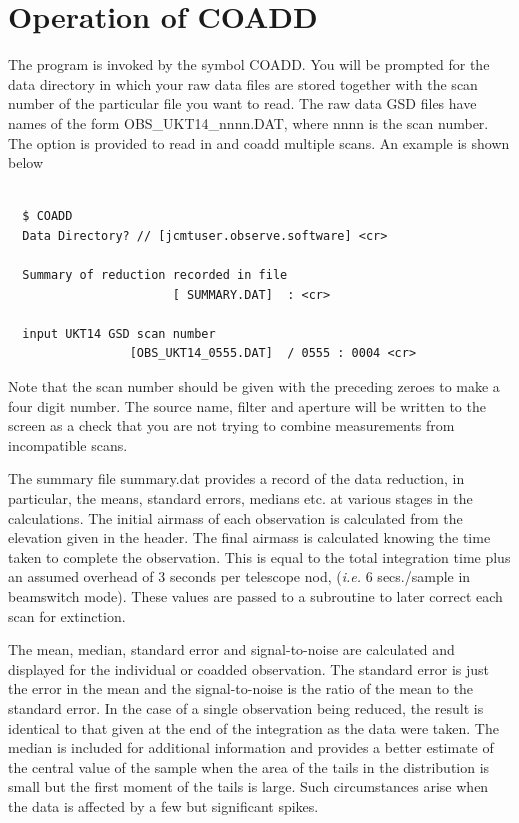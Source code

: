 \documentclass{article}
\begin{document}
\section{Operation of COADD}

 The program is invoked by the symbol COADD. You will be
prompted for the data directory in which your raw data files are stored
together with the scan number of the particular file you want to read. The
raw data GSD files have names of the form OBS\_UKT14\_nnnn.DAT, where nnnn
is the scan number.  The option is provided to read in and coadd multiple
scans. An example is shown below

\begin{verbatim}

  $ COADD
  Data Directory? // [jcmtuser.observe.software] <cr>

  Summary of reduction recorded in file
                       [ SUMMARY.DAT]  : <cr>

  input UKT14 GSD scan number
                 [OBS_UKT14_0555.DAT]  / 0555 : 0004 <cr>

\end{verbatim}

Note that the scan number should be given with the preceding zeroes to make a
four digit number. The source name, filter and aperture will be written to the
screen as a check that you are not trying to combine measurements from
incompatible scans.

The summary file summary.dat provides a record of the data reduction, in
particular, the means, standard errors, medians etc. at various stages in the
calculations.
The initial airmass of each observation is calculated from the elevation given
in the
header. The final airmass is calculated knowing the time taken to complete the
observation. This is equal to the total integration time plus an assumed
overhead of 3 seconds per telescope nod, ({\it i.e.} 6 secs./sample in
beamswitch mode). These values are passed to a subroutine to later correct
each scan for extinction.

 The mean, median, standard error and signal-to-noise are
calculated and displayed for the individual or coadded observation.
The standard error is just the error in the mean and the signal-to-noise
is the ratio of the mean to the standard error. In the case
of a single observation being reduced, the result is identical to that given at
the end of the integration as the data were taken. The median is included for
additional information and provides a better estimate of the central value of
the sample  when the area of the tails in the distribution is small but the
first moment of the tails is large. Such circumstances arise when the data is
affected by a few but significant spikes.
\end{document}
